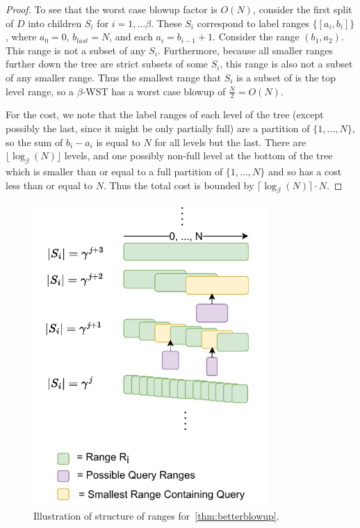 \documentclass{article}
\theoremstyle{plain}
\theoremstyle{definition}
\theoremstyle{remark}
\newcommand{\julian}[1]{{\color{red}{\bf Julian:} #1}}
\begin{document}
\wstblowup*
\begin{proof}
To see that the worst case blowup factor is $O(N)$, consider the first split of $D$ into children $S_i$ for $i = 1, \ldots \beta$. These $S_i$ correspond to label ranges $\{[a_i, b_i]\}$, where $a_0 = 0$, $b_{last} = N$, and each $a_i = b_{i - 1} + 1$. Consider the range $(b_1, a_2)$. This range is not a subset of any $S_i$. Furthermore, because all smaller ranges further down the tree are strict subsets of some $S_i$, this range is also not a subset of any smaller range. Thus the smallest range that $S_i$ is a subset of is the top level range, so a $\beta$-WST has a worst case blowup of $\frac{N}{2} = O(N)$.

For the cost, we note that the label ranges of each level of the tree (except possibly the last, since it might be only partially full) are a partition of $\{1,\ldots,N\}$, so the sum of $b_i - a_i$ is equal to $N$ for all levels but the last. There are $\lfloor\log_\beta(N)\rfloor$ levels, and one possibly non-full level at the bottom of the tree which is smaller than or equal to a full partition of $\{1,\ldots,N\}$ and so has a cost less than or equal to $N$. Thus the total cost is bounded by $\lceil\log_\beta(N)\rceil \cdot N$.
\end{proof}



\begin{figure}[t]
\begin{center}
\centerline{\includegraphics[width=9cm]{images/blowup-theory.pdf}}
\caption{Illustration of structure of ranges for~\cref{thm:betterblowup}. }
\label{fig:theory-blowup-help}
\end{center}
\end{figure}
\end{document}
